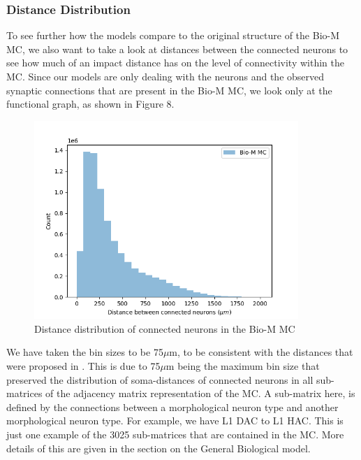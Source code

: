 \subsubsection{Distance Distribution}
To see further how the models compare to the original structure of the Bio-M MC, we also want to take a look at distances between the connected neurons to see how much of an impact distance has on the level of connectivity within the MC. Since our models are only dealing with the neurons and the observed synaptic connections that are present in the Bio-M MC, we look only at the functional graph, as shown in Figure 8.

\begin{figure}[H]
\begin{center}
\captionsetup{justification=centering}
\includegraphics[width=10cm]{BioM/BioM_dist_distr.png}
\caption{Distance distribution of connected neurons in the Bio-M MC}
\end{center}
\end{figure}

We have taken the bin sizes to be 75\(\mu\)m, to be consistent with the distances that were proposed in \cite{Reimann_2017}. This is due to 75$\mu$m being the maximum bin size that preserved the distribution of soma-distances of connected neurons in all sub-matrices of the adjacency matrix representation of the MC. A sub-matrix here, is defined by the connections between a morphological neuron type and another morphological neuron type. For example, we have L1 DAC to L1 HAC. This is just one example of the 3025 sub-matrices that are contained in the MC. More details of this are given in the section on the General Biological model.

